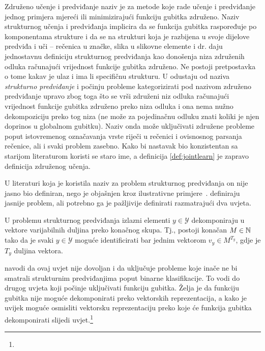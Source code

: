 Združeno učenje i predviđanje  naziv je za
metode koje rade učenje i predviđanje jednog primjera mjereći ili minimizirajući
funkciju gubitka združeno. Naziv strukturnog učenja i predviđanja
 implicira da se funkcija gubitka
raspoređuje po komponentama strukture i da se na strukturi koja je razbijena u
svoje dijelove predviđa i uči -- rečenica u značke, slika u slikovne elemente
i dr. \citet{daume14lts} daju jednostavnu definiciju strukturnog predviđanja kao
donošenja niza združenih odluka računajući vrijednost funkcije gubitka združeno.
Ne postoji pretpostavka o tome kakav je ulaz i ima li specifičnu strukturu. U
\citep{daume14lts, daume15naacltalk} odustaju od naziva \emph{strukturno
predviđanje} i počinju probleme kategorizirati pod nazivom združeno predviđanje
upravo zbog toga što se vrši združeni niz odluka računajući vrijednost
funkcije gubitka združeno preko niza odluka i ona nema nužno dekompoziciju preko
tog niza (ne može za pojedinačnu odluku znati koliki je njen doprinos u
globalnom gubitku). Naziv onda može uključivati združene probleme poput
istovremenog označavanja vrste riječi u rečenici i ovisnosnog parsanja
rečenice, ali i svaki problem zasebno. Kako bi nastavak bio konzistentan sa
starijom literaturom koristi se staro ime, a definicija \ref{def:jointlearn} je
zapravo definicija združenog učenja.

U literaturi koja je koristila naziv za problem strukturnog predviđanja on
nije jasno bio definiran, nego je objašnjen kroz ilustrativne
primjere~\citep{mccallum2000maximum, punyakanok2001use, lafferty2001conditional,
collins2002discriminative, taskar2003maximum, mcallester2004case,
tsochantaridis2005large}. \citet{daume09searn} definiraju jasnije problem, ali
potrebno ga je pažljivije definirati razmatrajući dva uvjeta.

\begin{condition} \label{uvjet1}

  U problemu strukturnog predviđanja izlazni elementi $y \in \mathcal{Y}$
  dekomponiraju u vektore varijabilnih duljina preko konačnog skupa. Tj.,
  postoji konačan $M \in \mathbb{N}$ tako da je svaki $y \in \mathcal{Y}$ moguće
  identificirati bar jednim vektorom $v_y \in M^{T_y}$, gdje je $T_y$ duljina
  vektora.

\end{condition}

\noindent
\citeauthor{daume06thesis} navodi da ovaj uvjet nije dovoljan i da uključuje
probleme koje inače ne bi smatrali strukturnim predviđanjima poput binarne
klasifikacije. To vodi do drugog uvjeta koji počinje uključivati funkciju
gubitka. Želja je da funkciju gubitka nije moguće dekomponirati preko vektorskih
reprezentacija, a kako je uvijek moguće osmisliti vektorsku reprezentaciju preko
koje će funkcija gubitka dekomponirati slijedi uvjet.\footnote{}

